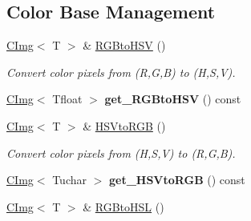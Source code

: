 \subsection*{Color Base Management}
\label{_amgrp5be3c886221a3477cf2c50b12f967cb8}
 \begin{DoxyCompactItemize}
\item 
\hypertarget{structcimg__library_1_1CImg_a6c0ab36ca2418c9b62590cdfdcbdc793}{
\hyperlink{structcimg__library_1_1CImg}{CImg}$<$ T $>$ \& \hyperlink{structcimg__library_1_1CImg_a6c0ab36ca2418c9b62590cdfdcbdc793}{RGBtoHSV} ()}
\label{structcimg__library_1_1CImg_a6c0ab36ca2418c9b62590cdfdcbdc793}

\begin{DoxyCompactList}\small\item\em Convert color pixels from (R,G,B) to (H,S,V). \item\end{DoxyCompactList}\item 
\hypertarget{structcimg__library_1_1CImg_aef4e92555cb579b1480de042bfb9dcf0}{
\hyperlink{structcimg__library_1_1CImg}{CImg}$<$ Tfloat $>$ {\bfseries get\_\-RGBtoHSV} () const }
\label{structcimg__library_1_1CImg_aef4e92555cb579b1480de042bfb9dcf0}

\item 
\hypertarget{structcimg__library_1_1CImg_a87cc3767b5078c5f63e09ba0109cf0d4}{
\hyperlink{structcimg__library_1_1CImg}{CImg}$<$ T $>$ \& \hyperlink{structcimg__library_1_1CImg_a87cc3767b5078c5f63e09ba0109cf0d4}{HSVtoRGB} ()}
\label{structcimg__library_1_1CImg_a87cc3767b5078c5f63e09ba0109cf0d4}

\begin{DoxyCompactList}\small\item\em Convert color pixels from (H,S,V) to (R,G,B). \item\end{DoxyCompactList}\item 
\hypertarget{structcimg__library_1_1CImg_a672ef1aa9a08fed8fdcecfc4b309e2ca}{
\hyperlink{structcimg__library_1_1CImg}{CImg}$<$ Tuchar $>$ {\bfseries get\_\-HSVtoRGB} () const }
\label{structcimg__library_1_1CImg_a672ef1aa9a08fed8fdcecfc4b309e2ca}

\item 
\hypertarget{structcimg__library_1_1CImg_a3b76b35625d85926b4e88227f89f734e}{
\hyperlink{structcimg__library_1_1CImg}{CImg}$<$ T $>$ \& \hyperlink{structcimg__library_1_1CImg_a3b76b35625d85926b4e88227f89f734e}{RGBtoHSL} ()}
\label{structcimg__library_1_1CImg_a3b76b35625d85926b4e88227f89f734e}


\end{DoxyCompactItemize}
